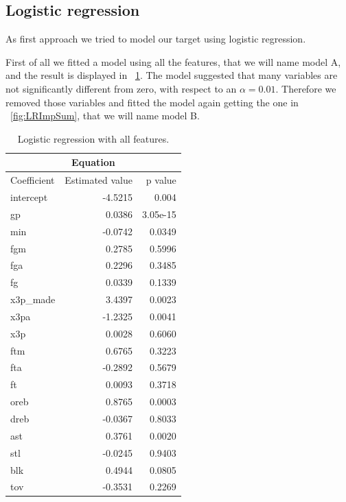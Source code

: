 \subsection{Logistic regression}

As first approach we tried to model our target using logistic regression.

First of all we fitted a model using all the features, that we will name model A, and the result is displayed in \Fig~\ref{table:LRAllSum}. The model suggested that many variables are not significantly different from zero, with respect to an $\alpha = 0.01$. Therefore we removed those variables and fitted the model again getting the one in \Fig~\ref{fig:LRImpSum}, that we will name model B.

\begin{table}[H]
	\begin{subtable}[h]{0.4\textwidth}
		\centering
		\begin{tabular}{|| l | r | r ||} 
			\hline
			\multicolumn{3}{|c|}{Equation} \\
			\hline
			Coefficient & Estimated value & p value \\
			\hline
			intercept & -4.5215 & 0.004 \\
			gp & 0.0386 & 3.05e-15 \\
			min & -0.0742 & 0.0349 \\
			fgm & 0.2785 & 0.5996 \\
			fga & 0.2296 & 0.3485 \\
			fg & 0.0339 & 0.1339 \\
			x3p\_made & 3.4397 & 0.0023 \\
			x3pa & -1.2325 & 0.0041 \\
			x3p & 0.0028 & 0.6060 \\
			ftm & 0.6765 & 0.3223 \\
			fta & -0.2892 & 0.5679 \\
			ft & 0.0093 & 0.3718 \\
			oreb & 0.8765 & 0.0003 \\
			dreb & -0.0367 & 0.8033 \\
			ast & 0.3761 & 0.0020 \\
			stl & -0.0245 & 0.9403 \\
			blk & 0.4944 & 0.0805 \\				
			tov & -0.3531 & 0.2269 \\		
			\hline
		\end{tabular}
		\caption{Logistic regression with all features.}
		\label{table:LRAllSum}
	\end{subtable}

\end{table}
